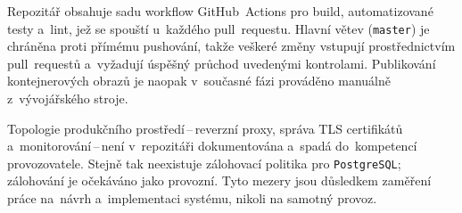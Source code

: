 Repozitář obsahuje sadu workflow GitHub~Actions pro build, automatizované testy a~lint, jež se spouští u~každého pull~requestu.
Hlavní větev (\texttt{master}) je chráněna proti přímému pushování, takže veškeré změny vstupují prostřednictvím pull~requestů a~vyžadují úspěšný průchod uvedenými kontrolami.
Publikování kontejnerových obrazů je naopak v~současné fázi prováděno manuálně z~vývojářského stroje.

Topologie produkčního prostředí\,--\,reverzní proxy, správa TLS certifikátů a~monitorování\,--\,není v~repozitáři dokumentována a~spadá do~kompetencí provozovatele.
Stejně tak neexistuje zálohovací politika pro \texttt{PostgreSQL}; zálohování je očekáváno jako provozní.
Tyto mezery jsou důsledkem zaměření práce na~návrh a~implementaci systému, nikoli na samotný provoz.
